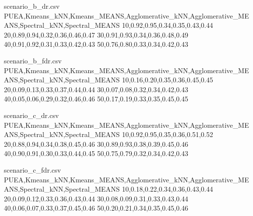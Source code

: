 \documentclass[pdflatex,sn-mathphys-num]{sn-jnl}%
\theoremstyle{thmstyleone}
\theoremstyle{thmstyletwo}
\theoremstyle{thmstylethree}
\begin{document}
\begin{filecontents*}{scenario_b_dr.csv}
PUEA,Kmeans_kNN,Kmeans_MEANS,Agglomerative_kNN,Agglomerative_MEANS,Spectral_kNN,Spectral_MEANS
10,0.92,0.95,0.34,0.35,0.43,0.44
20,0.89,0.94,0.32,0.36,0.46,0.47
30,0.91,0.93,0.34,0.36,0.48,0.49
40,0.91,0.92,0.31,0.33,0.42,0.43
50,0.76,0.80,0.33,0.34,0.42,0.43
\end{filecontents*}

\begin{filecontents*}{scenario_b_fdr.csv}
PUEA,Kmeans_kNN,Kmeans_MEANS,Agglomerative_kNN,Agglomerative_MEANS,Spectral_kNN,Spectral_MEANS
10,0.16,0.20,0.35,0.36,0.45,0.45
20,0.09,0.13,0.33,0.37,0.44,0.44
30,0.07,0.08,0.32,0.34,0.42,0.43
40,0.05,0.06,0.29,0.32,0.46,0.46
50,0.17,0.19,0.33,0.35,0.45,0.45
\end{filecontents*}

\begin{filecontents*}{scenario_c_dr.csv}
PUEA,Kmeans_kNN,Kmeans_MEANS,Agglomerative_kNN,Agglomerative_MEANS,Spectral_kNN,Spectral_MEANS
10,0.92,0.95,0.35,0.36,0.51,0.52
20,0.88,0.94,0.34,0.38,0.45,0.46
30,0.89,0.93,0.38,0.39,0.45,0.46
40,0.90,0.91,0.30,0.33,0.44,0.45
50,0.75,0.79,0.32,0.34,0.42,0.43
\end{filecontents*}

\begin{filecontents*}{scenario_c_fdr.csv}
PUEA,Kmeans_kNN,Kmeans_MEANS,Agglomerative_kNN,Agglomerative_MEANS,Spectral_kNN,Spectral_MEANS
10,0.18,0.22,0.34,0.36,0.43,0.44
20,0.09,0.12,0.33,0.36,0.43,0.44
30,0.08,0.09,0.31,0.33,0.43,0.44
40,0.06,0.07,0.33,0.37,0.45,0.46
50,0.20,0.21,0.34,0.35,0.45,0.46
\end{filecontents*}


\end{document}
